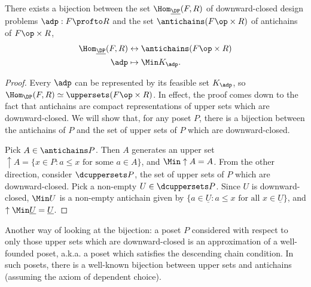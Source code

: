 \begin{lemma}
There exists a bijection between the set $\Hom_{\underline{\DP}}(F,R)$ of downward-closed design problems $\adp : F \profto R$ and the set $\antichains (F\op \times R)$ of antichains of $F\op \times R$, %
\begin{equation}
\begin{aligned}
\Hom_{\underline{\DP}}(F,R) &\leftrightarrow \antichains (F\op \times R) \\
\adp &\mapsto \Min K_\adp.
\end{aligned}
\end{equation}
\end{lemma}
\begin{proof}
Every $\adp$ can be represented by its feasible set $K_\adp$, so $\Hom_\DP(F,R) \simeq \uppersets (F\op \times R)$. In effect, the proof comes down to the fact that antichains are compact representations of upper sets which are downward-closed. We will show that, for any poset $P$, there is a bijection between the antichains of $P$ and the set of upper sets of $P$ which are downward-closed.

Pick $A \in \antichains P$. Then $A$ generates an upper set $\uparrow A = \{ x \in P : a \leq x \text{ for some $a \in A$} \}$, and $\Min \uparrow A = A$. From the other direction, consider $\dcuppersets  P$, the set of upper sets of $P$ which are downward-closed. Pick a non-empty $U \in \dcuppersets  P$. Since $U$ is downward-closed, $\Min U$ is a non-empty antichain given by $\{ a \in \underline{U} : a \leq x \text{ for all $x \in \underline{U}$} \}$, and $\uparrow \Min \underline{U} = \underline{U}$.
\end{proof}

\begin{remark}Another way of looking at the bijection: a poset $P$ considered with respect to only those upper sets which are downward-closed is an approximation of a well-founded poset, a.k.a. a poset which satisfies the descending chain condition. In such posets, there is a well-known bijection between upper sets and antichains (assuming the axiom of dependent choice).\end{remark}

 

